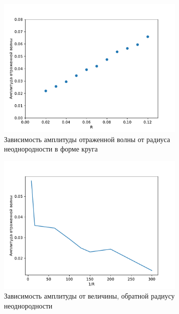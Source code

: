 \documentclass[a4paper, fontsize=14pt]{article}
\begin{document}
\begin{figure}
	\begin{subfigure}{1\textwidth}
	\centering
    \includegraphics[width=\textwidth]{refl_amp.pdf}
    \caption{Зависимость амплитуды отраженной волны от радиуса неоднородности в форме круга }
	\label{reflamp}
	\end{subfigure}
	\begin{subfigure}{1\textwidth}
    \centering
    \includegraphics[width=1\textwidth]{refl_amp_inv.pdf}
    \caption{Зависимость амплитуды от величины, обратной радиусу неоднородности }
    \label{reflampinv}
	\end{subfigure}
    \caption{}
\end{figure}
\end{document}

